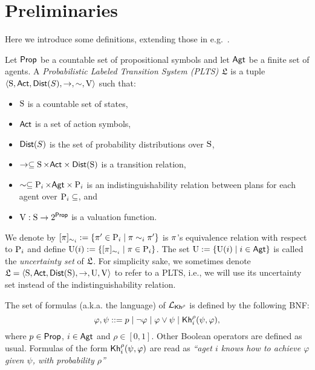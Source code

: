 \section{Preliminaries}
\label{sec:preliminaries}

Here we introduce some definitions, extending those in e.g.~\cite{AFSVQ21}.

\begin{definition}\label{def:plts}
    Let $\PROP$ be a countable set of propositional symbols and let $\AGT$ be a finite set of agents.  
    A \emph{Probabilistic Labeled Transition System (PLTS)} $\model$ is a tuple
    $\tup{\S,\ACT,\dist(S),\ra,\sim,\V}$ such that:
    \begin{itemize}
        \item $\S$ is a countable set of states,
        \item $\ACT$ is a set of action symbols,
        \item $\dist(S)$ is the set of probability distributions over $\S$,
        \item $\ra \subseteq \S \times \ACT \times \dist(\S)$ is a transition relation,
        \item $\sim\subseteq \DS{i} \times \AGT \times \DS{i}$ is an indistinguishability relation between plans for each agent over $\DS{i}\subseteq$, and
        \item $\V: \S \ra 2^\PROP$ is a valuation function.
    \end{itemize}
    We denote by $[\plan]_{\sim_i}:=\set{\plan' \in \DS{i} \mid \plan \sim_i \plan'}$ is $\plan$'s equivalence relation with respect to $\DS{i}$  and define $\Unc(i) := \set{[\plan]_{\sim_i} \mid \plan\in\DS{i}}$. The set $\Unc:=\set{\Unc(i) \mid i\in\AGT}$ is called the  \emph{uncertainty set} of $\model$. For simplicity sake, we sometimes denote $\model=\tup{\S,\ACT,\dist(\S),\ra,\Unc,\V}$ to refer to a PLTS, i.e., we will use its uncertainty set instead of the indistinguishability relation.
\end{definition}

\begin{definition}
    \label{def:syntax}
    The set of formulas (a.k.a. the language) of $\PKh$ is defined by the following BNF:
    \[
        \varphi, \psi ::= p \mid \neg \varphi \mid \varphi \vee \psi \mid \kh_i^\rho(\psi,\varphi),
    \]
    where $p\in\PROP$, $i\in\AGT$ and $\rho\in[0,1]$. Other Boolean operators are defined as usual. Formulas of the form $\kh_i^\rho(\psi,\varphi)$ are read as \emph{``aget $i$ knows how to achieve $\varphi$ given $\psi$, with probability $\rho$''}
\end{definition}

